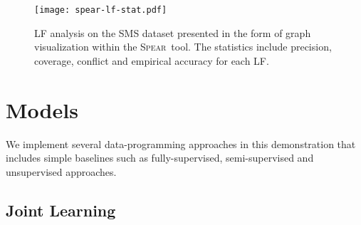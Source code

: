 \documentclass[11pt]{article}
\newcommand{\spear}{\mbox{\textsc{Spear}}}
\begin{document}

\begin{figure*}[!h]
    \centering
    \texttt{[image: spear-lf-stat.pdf]}
    \caption{LF analysis on the SMS dataset presented in the form of graph visualization within the \spear\ tool. The statistics include precision, coverage, conflict and empirical accuracy for each LF.}
    \label{fig:metric}
\end{figure*}

\section{Models} \label{sec:models}
We implement several data-programming approaches in this demonstration that includes simple baselines such as fully-supervised, semi-supervised and unsupervised approaches.

\subsection{Joint Learning \cite{spear}}
    
\end{document}
